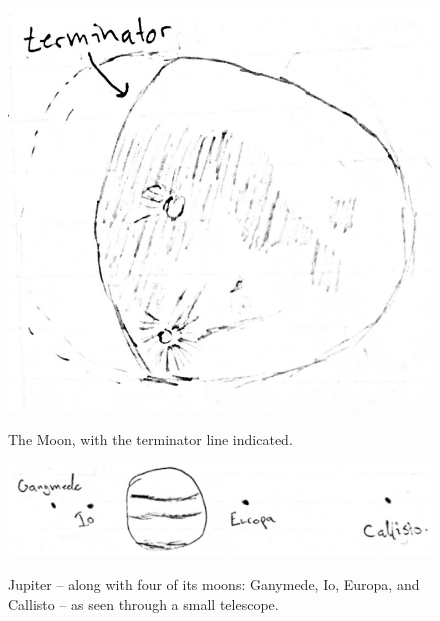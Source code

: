 \documentclass[11pt]{article}
\begin{document}
\begin{figure}[H]
\caption{The Moon, with the terminator line indicated.}
\begin{center}
\includegraphics[scale=0.5]{figures/moon.jpg}
\label{fig:moon}
\end{center}
\end{figure}

\begin{figure}[H]
\caption{Jupiter -- along with four of its moons: Ganymede, Io, Europa, and Callisto -- as seen through a small telescope.}
\begin{center}
\includegraphics[scale=0.5]{figures/jupiter.jpg}
\label{fig:jupiter}
\end{center}
\end{figure}
\end{document}
